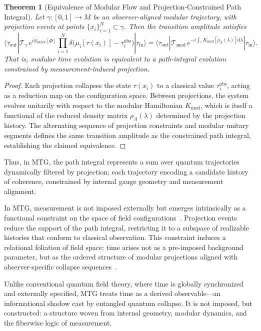 \documentclass[11pt]{article}
\newtheorem{theorem}{Theorem}
\begin{document}
\begin{theorem}[Equivalence of Modular Flow and Projection-Constrained Path Integral]
Let \( \gamma: [0,1] \to M \) be an observer-aligned modular trajectory, with projection events at points \( \{x_i\}_{i=1}^N \subset \gamma \). Then the transition amplitude satisfies
\[
\langle \tau_{\mathrm{out}} | \mathcal{T}_\gamma \, e^{i S_{\mathrm{SUSY}}[\Phi]} \prod_{i=1}^N \delta\big( \mu_i[\tau(x_i)] - \tau^{\mathrm{obs}}_i \big) | \tau_{\mathrm{in}} \rangle
=
\langle \tau_{\mathrm{out}} | \mathcal{T}_{\mathrm{mod}} \, e^{-i \int_\gamma K_{\mathrm{mod}}[\rho_A(\lambda)] \mathrm{d} \lambda} | \tau_{\mathrm{in}} \rangle.
\]
That is, modular time evolution is equivalent to a path-integral evolution constrained by measurement-induced projection.
\end{theorem}

\begin{proof}
Each projection collapses the state \( \tau(x_i) \) to a classical value \( \tau_i^{\mathrm{obs}} \), acting as a reduction map on the configuration space. Between projections, the system evolves unitarily with respect to the modular Hamiltonian \( K_{\mathrm{mod}} \), which is itself a functional of the reduced density matrix \( \rho_A(\lambda) \) determined by the projection history. The alternating sequence of projection constraints and modular unitary segments defines the same transition amplitude as the constrained path integral, establishing the claimed equivalence.
\end{proof}

Thus, in MTG, the path integral represents a sum over quantum trajectories dynamically filtered by projection; each trajectory encoding a candidate history of coherence, constrained by internal gauge geometry and measurement alignment.

In MTG, measurement is not imposed externally but emerges intrinsically as a functional constraint on the space of field configurations~\cite{tomaz2025rqd}. Projection events reduce the support of the path integral, restricting it to a subspace of realizable histories that conform to classical observation. This constraint induces a relational foliation of field space: time arises not as a pre-imposed background parameter, but as the ordered structure of modular projections aligned with observer-specific collapse sequences~\cite{debianchi2024achronotopic}.

Unlike conventional quantum field theory, where time is globally synchronized and externally specified, MTG treats time as a derived observable—an informational shadow cast by entangled quantum collapse. It is not imposed, but constructed: a structure woven from internal geometry, modular dynamics, and the fiberwise logic of measurement.
\end{document}
